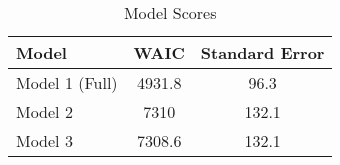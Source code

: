 \begin{table}[h!]
\centering
\begin{tabular}{|l|c|c|}
\hline
\rowcolor[HTML]{E7EAF6} 
\textbf{Model} & \textbf{WAIC} & \textbf{Standard Error} \\ \hline
Model 1 (Full) & 4931.8 & 96.3 \\ \hline
Model 2 & 7310 & 132.1  \\ \hline
Model 3 & 7308.6 & 132.1  \\ \hline
\end{tabular}
\caption{Model Scores}
\end{table}
